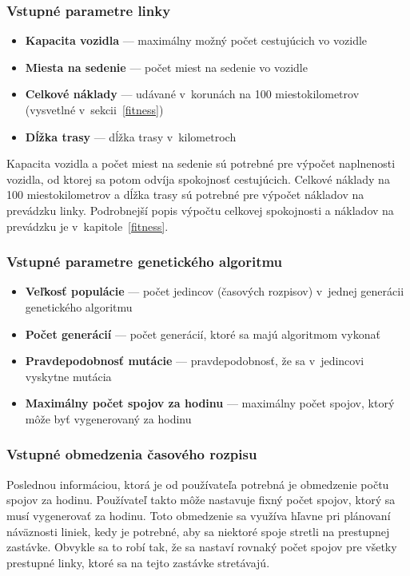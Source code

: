 \subsubsection{Vstupné parametre linky}
\begin{itemize}
  \item \textbf{Kapacita vozidla} --- maximálny možný počet cestujúcich vo vozidle
  \item \textbf{Miesta na sedenie} --- počet miest na sedenie vo vozidle
  \item \textbf{Celkové náklady} --- udávané v~korunách na 100 miestokilometrov (vysvetlné v~sekcii~\ref{fitness})  
  \item \textbf{Dĺžka trasy} --- dĺžka trasy v~kilometroch
\end{itemize}
Kapacita vozidla a počet miest na sedenie sú potrebné pre výpočet naplnenosti vozidla, od ktorej sa potom odvíja spokojnosť cestujúcich.
Celkové náklady na 100 miestokilometrov a dĺžka trasy sú potrebné pre výpočet nákladov na prevádzku linky.
Podrobnejší popis výpočtu celkovej spokojnosti a nákladov na prevádzku je v~kapitole~\ref{fitness}.

\subsubsection{Vstupné parametre genetického algoritmu}
\begin{itemize}
  \item \textbf{Veľkosť populácie} --- počet jedincov (časových rozpisov) v~jednej generácii genetického algoritmu
  \item \textbf{Počet generácií} --- počet generácií, ktoré sa majú algoritmom vykonať
  \item \textbf{Pravdepodobnosť mutácie} --- pravdepodobnosť, že sa v~jedincovi vyskytne mutácia
  \item \textbf{Maximálny počet spojov za hodinu} --- maximálny počet spojov, ktorý môže byť vygenerovaný za hodinu
\end{itemize}

\subsubsection{Vstupné obmedzenia časového rozpisu}
Poslednou informáciou, ktorá je od používateľa potrebná je obmedzenie počtu spojov za hodinu.
Používateľ takto môže nastavuje fixný počet spojov, ktorý sa musí vygenerovať za hodinu.
Toto obmedzenie sa využíva hľavne pri plánovaní náväznosti liniek, kedy je potrebné, aby sa niektoré spoje stretli na prestupnej zastávke.
Obvykle sa to robí tak, že sa nastaví rovnaký počet spojov pre všetky prestupné linky, ktoré sa na tejto zastávke stretávajú.

